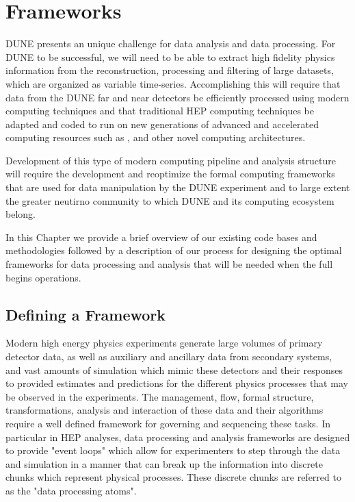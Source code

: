 \documentclass[../main-v1.tex]{subfiles}
\begin{document}
\chapter{Frameworks }
\label{ch:fworks}

DUNE presents an unique challenge for data analysis and data processing. For DUNE to be successful, we will need to be able to extract high fidelity physics information from the reconstruction, processing and filtering of large datasets, which are organized as variable time-series.   Accomplishing this will require that data from the DUNE far and near detectors  be efficiently processed using modern computing techniques and that traditional HEP computing techniques be adapted and coded to run on new generations of advanced and accelerated computing resources such as ,  and other novel computing architectures.  

Development of this type of modern computing pipeline and analysis structure will require the development and reoptimize the formal computing frameworks that are used for data manipulation by the DUNE experiment and to large extent the greater neutirno community to which DUNE and its computing ecosystem belong.

In this Chapter we provide a brief overview of our existing code bases and methodologies followed by a description of our process for designing the optimal frameworks for data processing and analysis that will be needed when the full  begins operations.  

\section{Defining a Framework}

Modern high energy physics experiments generate large volumes of primary detector data, as well as auxiliary and ancillary data from secondary systems, and vast amounts of simulation which mimic these detectors and their responses to provided estimates and predictions for the different physics processes that may be observed in the experiments.  The management, flow, formal structure, transformations, analysis and interaction of these data and their algorithms require a well defined framework for governing and sequencing these tasks.  In particular in HEP analyses, data processing and analysis frameworks are designed to provide "event loops" which allow for experimenters to step through the data and simulation in a manner that can break up the information into discrete chunks which represent physical processes.  These discrete chunks are referred to as the "data processing atoms".
\end{document}
